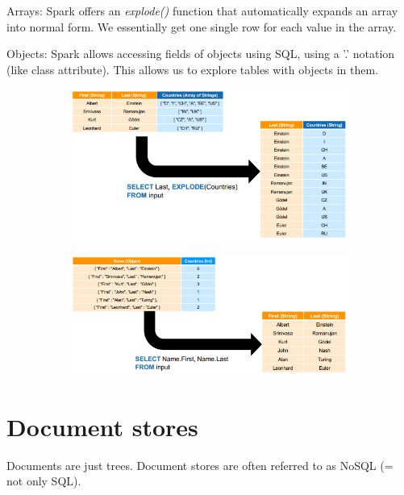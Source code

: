 \documentclass[11pt,oneside,a4paper]{article}
\begin{document}
\begin{compactitem}
\item Arrays: Spark offers an \textit{explode()} function that automatically expands an array into normal form. We essentially get one single row for each value in the array.
\item Objects: Spark allows accessing fields of objects using SQL, using a '.' notation (like class attribute). This allows us to explore tables with objects in them. 
\end{compactitem}

\begin{figure}[hb!]
	\centering
	\begin{subfigure}[t]{.5\textwidth}
		\centering
		\includegraphics[width=0.9\linewidth]{figures/spark_nestedness_arrays}
	\end{subfigure}%
	\begin{subfigure}[t]{.5\textwidth}
		\centering
		\includegraphics[width=0.9\linewidth]{figures/spark_nestedness_objects}
	\end{subfigure}
\end{figure}


\section{Document stores}

Documents are just trees. Document stores are often referred to as NoSQL (= not only SQL).\\
\end{document}
